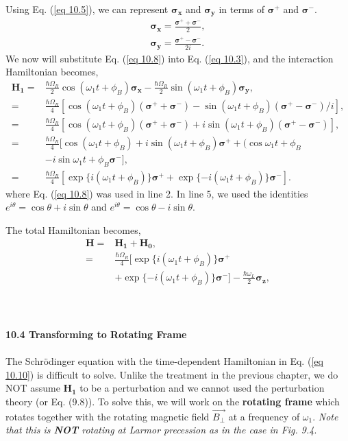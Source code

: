\documentclass{article}
\begin{document}
Using Eq. (\ref{eq 10.5}), we can represent $\boldsymbol{\sigma_x}$ and $\boldsymbol{\sigma_y}$ 
in terms of $\boldsymbol{\sigma^+}$ and $\boldsymbol{\sigma^-}$.
\begin{align*}\label{eq 10.8}
    \boldsymbol{\sigma_x}=\frac{\boldsymbol{\sigma^+}+\boldsymbol{\sigma^-}}{2},\\
    \boldsymbol{\sigma_y}=\frac{\boldsymbol{\sigma^+}-\boldsymbol{\sigma^-}}{2i}.\tag{10.8}
\end{align*}
We now will substitute Eq. (\ref{eq 10.8}) into Eq. (\ref{eq 10.3}), and the interaction 
Hamiltonian becomes,
\begin{align*}\label{eq 10.9}
    \boldsymbol{H_1}=&\frac{\hbar\varOmega_R}{2}\cos(\omega_1t+\phi_B)\boldsymbol{\sigma_x}-\frac{\hbar\varOmega_R}{2}\sin(\omega_1t+\phi_B)\boldsymbol{\sigma_y},\\
    =&\frac{\hbar\varOmega_R}{4}[\cos(\omega_1t+\phi_B)(\boldsymbol{\sigma^+}+\boldsymbol{\sigma^-})
    -\sin(\omega_1t+\phi_B)(\boldsymbol{\sigma^+}-\boldsymbol{\sigma^-})/i],\\
    =&\frac{\hbar\varOmega_R}{4}[\cos(\omega_1t+\phi_B)(\boldsymbol{\sigma^+}+\boldsymbol{\sigma^-})
    +i\sin(\omega_1t+\phi_B)(\boldsymbol{\sigma^+}-\boldsymbol{\sigma^-})],\\
    =&\frac{\hbar\varOmega_R}{4}[\cos(\omega_1t+\phi_B)+i\sin(\omega_1t+\phi_B)\boldsymbol{\sigma^+}+(\cos{\omega_1t+\phi_B}\\
    &-i\sin{\omega_1t+\phi_B}\boldsymbol{\sigma^-}],\\
    =&\frac{\hbar\varOmega_R}{4}[\exp \{ i(\omega_1t+\phi_B) \} \boldsymbol{\sigma^+}+\exp \{ -i(\omega_1t+\phi_B) \} \boldsymbol{\sigma^-}]. \tag{10.9}
\end{align*}
where Eq. (\ref{eq 10.8}) was used in line 2. In line 5, we used the identities $e^{i\theta}=\cos\theta+i\sin\theta$ and
$e^{i\theta}=\cos\theta-i\sin\theta$.

The total Hamiltonian becomes,
\begin{align*}\label{eq 10.10}
    \boldsymbol{H}=&\boldsymbol{H_1}+\boldsymbol{H_0},\\
    =&\frac{\hbar\varOmega_R}{4}[\exp \{ i(\omega_1t+\phi_B) \} \boldsymbol{\sigma^+}\\
    &+\exp \{ -i(\omega_1t+\phi_B) \} \boldsymbol{\sigma^-}]-\frac{\hbar\omega_L}{2}\boldsymbol{\sigma_z},\tag{10.10}
\end{align*}\\\\\\
\textbf{\large 10.4 Transforming to Rotating Frame}\\\\
The Schr\"{o}dinger equation with the time-dependent Hamiltonian in Eq. (\ref{eq 10.10}) is
difficult to solve. Unlike the treatment in the previous chapter, we do NOT assume 
$\boldsymbol{H_1}$ to be a perturbation and we cannot used the perturbation theory (or Eq. (9.8)).
To solve this, we will work on the \textbf{rotating frame} which rotates together with the
rotating magnetic field $\vec{B_\bot}$ at a frequency of $\omega_1$. \textit{Note that this is \textbf{NOT} rotating at 
Larmor precession as in the case in Fig. 9.4}.
\end{document}

